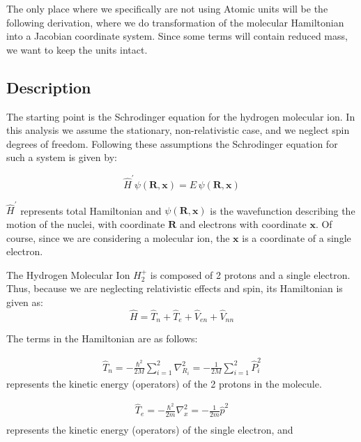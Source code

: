 The only place where we specifically are not using Atomic units will be the following derivation, where we do transformation of the molecular Hamiltonian into a Jacobian coordinate system. Since some terms will contain reduced mass, we want to keep the units intact.

\subsection{Description}

The starting point is the Schrodinger equation for the hydrogen molecular ion. In this analysis we assume the stationary, non-relativistic case, and we neglect spin degrees of freedom. Following these assumptions the Schrodinger equation for such a system is given by:

\begin{equation}\label{sch1}
\hat{H}^{'}\psi\left(\mathbf{R},\mathbf{x}\right) = E\,\psi\left(\mathbf{R},\mathbf{x}\right)
\end{equation}

$ \hat{H}^{'} $ represents total Hamiltonian and $ \psi\left(\mathbf{R},\mathbf{x}\right) $ is the wavefunction describing the motion of the nuclei, with coordinate $ \mathbf{R} $ and electrons with coordinate $\mathbf{x} $. Of course, since we are considering a molecular ion, the $\mathbf{x} $ is a coordinate of a single electron.

The Hydrogen Molecular Ion $ H_2^{+} $ is composed of 2 protons and a single electron. Thus, because we are neglecting relativistic effects and spin, its Hamiltonian is given as:
\begin{equation}\label{hh}
\hat{H} = \hat{T}_n + \hat{T}_e + \hat{V}_{en} + \hat{V}_{nn} 
\end{equation}

The terms in the Hamiltonian are as follows:

\begin{equation}
\begin{split}
 \hat{T}_n = - \frac{\hbar^2}{2M}\sum_{i=1}^2{\nabla_{R_i}^2 } = -\frac{1}{2M}\sum_{i=1}^2{\hat{P}_i^2 }
\end{split}
\end{equation}
represents the kinetic energy (operators) of the 2 protons in the molecule.

\begin{equation}
\begin{split}
 \hat{T}_e= -\frac{\hbar^2}{2m}\nabla_{x}^2 = -\frac{1}{2m}\hat{p}^2  \\[.8em]
\end{split}
\end{equation}
represents the kinetic energy (operators) of the single electron, and

